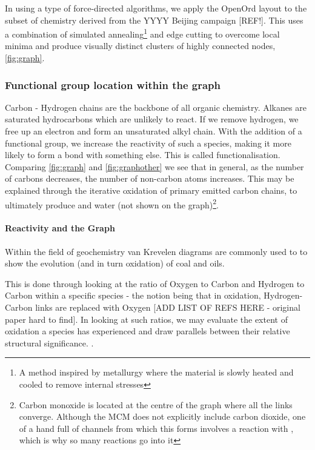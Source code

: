 In using a type of force-directed algorithms, we apply the OpenOrd layout \cite{ord} to the subset of chemistry derived from the YYYY Beijing campaign [REF!]. This uses a combination of simulated annealing\footnote{A method inspired by metallurgy where the material is slowly heated and cooled to remove internal stresses} and edge cutting to overcome local minima and produce visually distinct clusters of highly connected nodes, \autoref{fig:graph}.






\subsubsection{Functional group location within the graph}

Carbon - Hydrogen chains are the backbone of all organic chemistry. Alkanes are saturated hydrocarbons which are unlikely to react. If we remove hydrogen, we free up an electron and form an unsaturated alkyl chain. With the addition of a functional group, we increase the reactivity of such a species, making it more likely to form a bond with something else. This is called functionalisation. Comparing \autoref{fig:graph} and \autoref{fig:graphother} we see that in general, as the number of carbons decreases, the number of non-carbon atoms increases. This may be explained through the iterative oxidation of primary emitted carbon chains, to ultimately produce  and water (not shown on the graph)\footnote{Carbon monoxide is located at the centre of the graph where all the links converge. Although the MCM does not explicitly include carbon dioxide, one of a hand full of channels from which this forms involves a reaction with , which is why so many reactions go into it}.

\paragraph{Reactivity and the Graph}
Within the field of geochemistry van Krevelen diagrams are commonly used to to show the evolution (and in turn oxidation) of coal and oils.

This is done through looking at the ratio of Oxygen to Carbon and Hydrogen to Carbon within a specific species - the notion being that in oxidation, Hydrogen-Carbon links are replaced with Oxygen [ADD LIST OF REFS HERE - original paper hard to find]. In looking at such ratios, we may evaluate the extent of oxidation a species has experienced and draw parallels between their relative structural significance.  \cite{krsig}.

